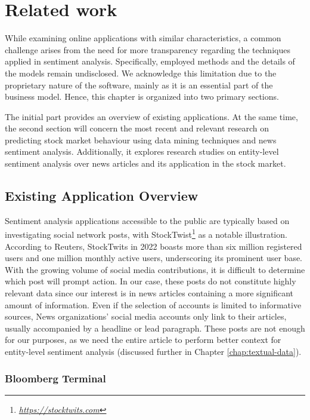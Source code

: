 \chapter{Related work}
\label{chap:related-work}
While examining online applications with similar characteristics, a common challenge arises from the need for more transparency regarding the techniques applied in sentiment analysis. Specifically, employed methods and the details of the models remain undisclosed. We acknowledge this limitation due to the proprietary nature of the software, mainly as it is an essential part of the business model. Hence, this chapter is organized into two primary sections. 

The initial part provides an overview of existing applications. At the same time, the second section will concern the most recent and relevant research on predicting stock market behaviour using data mining techniques and news sentiment analysis. Additionally, it explores research studies on entity-level sentiment analysis over news articles and its application in the stock market.

\section{Existing Application Overview}
\label{sec:existing-application-overview}

Sentiment analysis applications accessible to the public are typically based on investigating social network posts, with StockTwist\footnote{\href{https://stocktwits.com}{\textit{https://stocktwits.com}}} as a notable illustration. According to Reuters, StockTwits in 2022 boasts more than six million registered users and one million monthly active users, underscoring its prominent user base. With the growing volume of social media contributions, it is difficult to determine which post will prompt action. In our case, these posts do not constitute highly relevant data since our interest is in news articles containing a more significant amount of information. Even if the selection of accounts is limited to informative sources, News organizations' social media accounts only link to their articles, usually accompanied by a headline or lead paragraph. These posts are not enough for our purposes, as we need the entire article to perform better context for entity-level sentiment analysis (discussed further in Chapter \ref{chap:textual-data}).

\subsection{Bloomberg Terminal}
\label{subsec:bloomberg-terminal}

